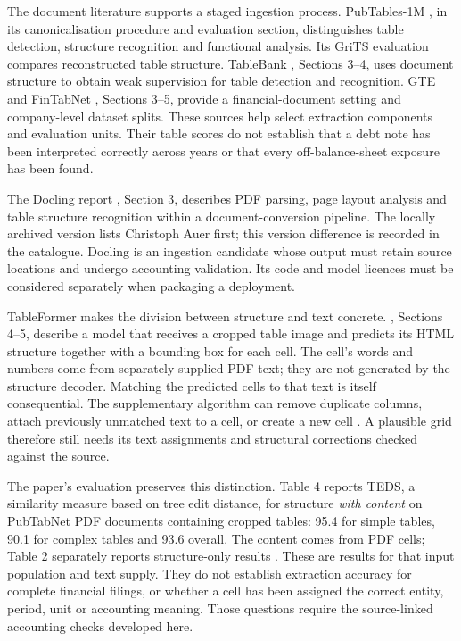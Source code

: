 The document literature supports a staged ingestion process. PubTables-1M
\citep{smock2022}, in its canonicalisation procedure and evaluation section,
distinguishes table detection, structure recognition and functional analysis.
Its GriTS evaluation compares reconstructed table structure. TableBank
\citep{li2020}, Sections 3--4, uses document structure to obtain weak supervision
for table detection and recognition. GTE and FinTabNet \citep{zheng2021},
Sections 3--5, provide a financial-document setting and company-level dataset
splits. These sources help select extraction components and evaluation units.
Their table scores do not establish that a debt note has been interpreted
correctly across years or that every off-balance-sheet exposure has been found.

The Docling report \citep{nassar2024}, Section 3, describes PDF parsing, page
layout analysis and table structure recognition within a document-conversion
pipeline. The locally archived version lists Christoph Auer first; this
version difference is recorded in the catalogue. Docling is an ingestion
candidate whose output must retain source locations and undergo accounting
validation. Its code and model licences must be considered separately when
packaging a deployment.

\enlargethispage{\baselineskip}
TableFormer makes the division between structure and text concrete.
\citet{nassar2022tableformer}, Sections 4--5, describe a model that receives a
cropped table image and predicts its HTML structure together with a bounding
box for each cell. The cell's words and numbers come from separately supplied
PDF text; they are not generated by the structure decoder. Matching the
predicted cells to that text is itself consequential. The supplementary
algorithm can remove duplicate columns, attach previously unmatched text to a
cell, or create a new cell \citep[Section 2]{nassar2022tableformersupp}. A
plausible grid therefore still needs its text assignments and structural
corrections checked against the source.

The paper's evaluation preserves this distinction. Table 4 reports TEDS,
a similarity measure based on tree edit distance, for structure \emph{with
content} on PubTabNet PDF documents containing cropped tables: 95.4 for simple
tables, 90.1 for complex tables and 93.6 overall. The content comes from PDF
cells; Table 2 separately reports structure-only results
\citep[Tables 2 and 4, p.~4620]{nassar2022tableformer}. These are results for
that input population and text supply. They do not establish extraction
accuracy for complete financial filings, or whether a cell has been assigned
the correct entity, period, unit or accounting meaning. Those questions require
the source-linked accounting checks developed here.



